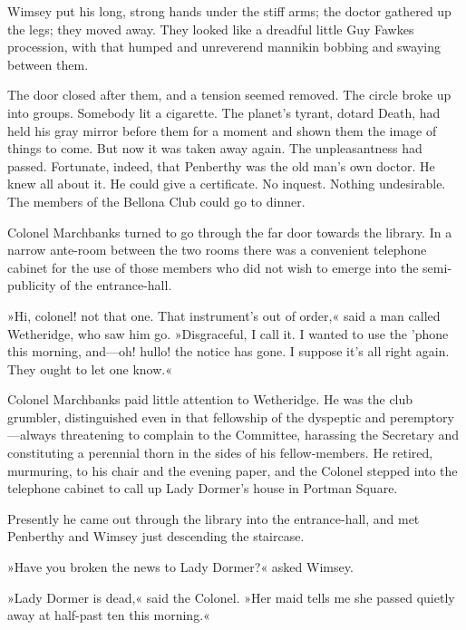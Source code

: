 Wimsey put his long, strong hands under the stiff arms; the doctor gathered up the legs; they moved away. They looked like a dreadful little Guy Fawkes procession, with that humped and unreverend mannikin bobbing and swaying between them.

The door closed after them, and a tension seemed removed. The circle broke up into groups. Somebody lit a cigarette. The planet's tyrant, dotard Death, had held his gray mirror before them for a moment and shown them the image of things to come. But now it was taken away again. The unpleasantness had passed. Fortunate, indeed, that Penberthy was the old man's own doctor. He knew all about it. He could give a certificate. No inquest. Nothing undesirable. The members of the Bellona Club could go to dinner.

Colonel Marchbanks turned to go through the far door towards the library. In a narrow ante-room between the two rooms there was a convenient telephone cabinet for the use of those members who did not wish to emerge into the semi-publicity of the entrance-hall.

»Hi, colonel! not that one. That instrument's out of order,« said a man called Wetheridge, who saw him go. »Disgraceful, I call it. I wanted to use the 'phone this morning, and\allowbreak---\allowbreak oh! hullo! the notice has gone. I suppose it's all right again. They ought to let one know.«

Colonel Marchbanks paid little attention to Wetheridge. He was the club grumbler, distinguished even in that fellowship of the dyspeptic and peremptory\allowbreak---\allowbreak always threatening to complain to the Committee, harassing the Secretary and constituting a perennial thorn in the sides of his fellow-members. He retired, murmuring, to his chair and the evening paper, and the Colonel stepped into the telephone cabinet to call up Lady Dormer's house in Portman Square.

Presently he came out through the library into the entrance-hall, and met Penberthy and Wimsey just descending the staircase.

»Have you broken the news to Lady Dormer?« asked Wimsey.

»Lady Dormer is dead,« said the Colonel. »Her maid tells me she passed quietly away at half-past ten this morning.«